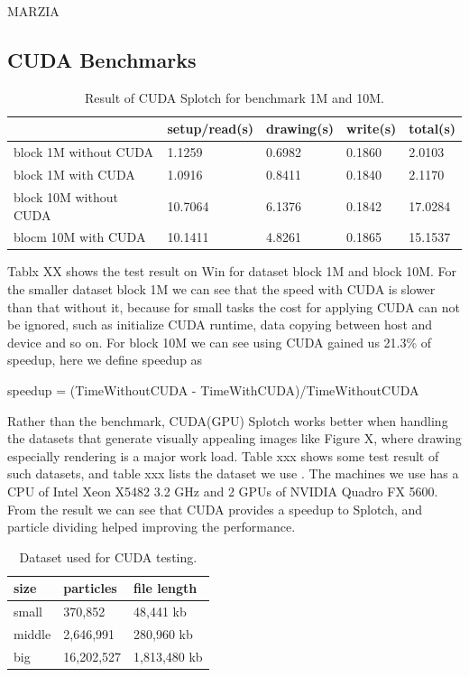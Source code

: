MARZIA   
   

\subsection{CUDA Benchmarks}

\begin{table}
\caption{Result of CUDA Splotch for benchmark 1M and 10M.}
\begin{tabular}{|l|l|l|l|l|}
\hline
	& setup/read(s) & 	drawing(s) & 	write(s) & 	total(s) \\
\hline
block 1M without CUDA & 	1.1259 & 	0.6982 & 	0.1860 & 	2.0103 \\
\hline
block 1M with CUDA & 	1.0916 & 	0.8411 & 	0.1840 & 	2.1170 \\
\hline
block 10M without CUDA & 	10.7064 & 	6.1376 & 	0.1842 & 	17.0284 \\
\hline
blocm 10M with CUDA & 	10.1411 & 	4.8261 & 	0.1865 & 	15.1537 \\
\hline
\end{tabular}
\end{table}

Tablx XX shows the test result on Win for dataset block 1M and block 10M. For the
smaller dataset block 1M we can see that the speed with CUDA is slower than that without
it, because for small tasks the cost for applying CUDA can not be ignored, 
such as initialize CUDA runtime, data copying between host and device and so on. For block
10M we can see using CUDA gained us 21.3\% of speedup, here we define speedup as

speedup = (TimeWithoutCUDA - TimeWithCUDA)/TimeWithoutCUDA

Rather than the benchmark, CUDA(GPU) Splotch works better when handling the datasets
that generate visually appealing images like Figure X, where drawing especially rendering
is a major work load. Table xxx shows some test result of such datasets, 
and table xxx lists the dataset we use . The machines we use has a CPU of Intel Xeon X5482 3.2 GHz and
2 GPUs of NVIDIA Quadro FX 5600. From the result we can see that CUDA provides a speedup to Splotch, and 
particle dividing helped improving the performance.

\begin{table}
\caption{Dataset used for CUDA testing.}
\begin{tabular}{|l|l|l|}
\hline
	size	& particles & file length \\
\hline
	small	& 370,852	& 48,441 kb \\
\hline
	middle	& 2,646,991	& 280,960 kb \\
\hline
	big	& 16,202,527& 	1,813,480 kb \\
\hline
\end{tabular}
\end{table}

